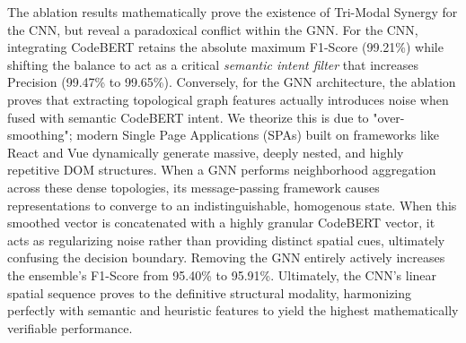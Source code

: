 \documentclass[conference]{IEEEtran}
\begin{document}
\begin{table}[htbp]
\caption{Architectural Ablation Study proving Tri-Modal Synergy}
\begin{center}
\label{tab:ablation}
\end{center}
\end{table}

The ablation results mathematically prove the existence of Tri-Modal Synergy for the CNN, but reveal a paradoxical conflict within the GNN. For the CNN, integrating CodeBERT retains the absolute maximum F1-Score (99.21\%) while shifting the balance to act as a critical \textit{semantic intent filter} that increases Precision (99.47\% to 99.65\%). Conversely, for the GNN architecture, the ablation proves that extracting topological graph features actually introduces noise when fused with semantic CodeBERT intent. We theorize this is due to "over-smoothing"; modern Single Page Applications (SPAs) built on frameworks like React and Vue dynamically generate massive, deeply nested, and highly repetitive DOM structures. When a GNN performs neighborhood aggregation across these dense topologies, its message-passing framework causes representations to converge to an indistinguishable, homogenous state. When this smoothed vector is concatenated with a highly granular CodeBERT vector, it acts as regularizing noise rather than providing distinct spatial cues, ultimately confusing the decision boundary. Removing the GNN entirely actively increases the ensemble's F1-Score from 95.40\% to 95.91\%. Ultimately, the CNN's linear spatial sequence proves to the definitive structural modality, harmonizing perfectly with semantic and heuristic features to yield the highest mathematically verifiable performance.
\end{document}
